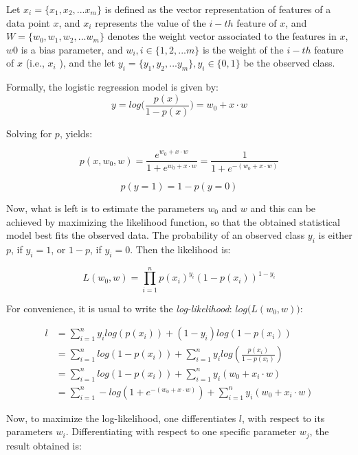 Let $x_i = \{x_1 , x_2 , ...x_m \}$ is defined as the vector representation of features of a data point $x$, and $x_i$ represents the value of the $i-th$ feature of $x$, and $W = \{w_0, w_1, w_2, ...w_m\}$ denotes the weight vector associated to the features in $x$, $w0$ is a bias parameter, and $w_i, i \in \{1, 2, ...m\}$ is the weight of the $i-th$ feature of $x$ (i.e., $x_i$ ), and the let $y_i = \{y_1 , y_2 , ...y_m \}, y_i \in \{0,1\}$ be the observed class.

Formally, the logistic regression model is given by:
\begin{equation}
y = log\bigg(\frac{p(x)}{1-p(x)}\bigg) = w_0 + x \cdot w 
\end{equation}

Solving for $p$, yields:

\begin{equation}
p(x,w_0,w) = \frac{e^{w_0 + x \cdot w }}{1+e^{w_0 + x\cdot w }} = \frac{1}{1 + e^{-(w_0 + x \cdot w )}}
\end{equation}

\begin{equation}
p(y=1) = 1 - p(y=0) 
\end{equation}

Now, what is left is to estimate the parameters $w_0$ and $w$ and this can be achieved by maximizing the likelihood function, so that the obtained statistical model best fits the observed data. 
The probability of an observed class $y_i$ is either $p$, if $y_i = 1$, or $1-p$, if $y_i = 0$. Then the likelihood is: 

\begin{equation}
L(w_0,w) = \prod_{i=1}^{n} p(x_i)^{y_i}(1-p(x_i))^{1-y_i} 
\end{equation}

For convenience, it is usual to write the \textit{log-likelihood}: $log\bigg(L(w_0,w)\bigg)$:


\begin{align} 
l & = \sum_{i=1}^{n} y_i log(p(x_i))+(1-y_i)log(1-p(x_i)) \\
& = \sum_{i=1}^{n} log(1-p(x_i)) + \sum_{i=1}^{n} y_i log(\frac{p(x_i)}{1-p(x_i)}) \\
& = \sum_{i=1}^{n} log(1-p(x_i)) + \sum_{i=1}^{n} y_i(w_0 + x_i \cdot w) \\
& = \sum_{i=1}^{n} - log(1 + e^{-(w_0 + x \cdot w )} ) + \sum_{i=1}^{n} y_i(w_0 + x_i \cdot w)
\end{align}

Now, to maximize the log-likelihood, one differentiates $l$, with respect to its parameters $w_i$. Differentiating with respect to one specific parameter $w_j$, the result obtained is:

